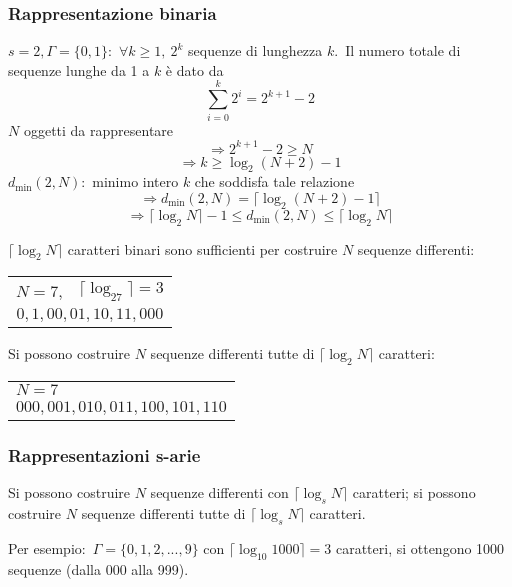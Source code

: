 \subsubsection{Rappresentazione binaria}

$s=2, \Gamma = \{0,1\}$:\ $\forall k \geq 1,\ 2^k$ sequenze di lunghezza $k$.\
Il numero totale di sequenze lunghe da 1 a $k$ è dato da \[\sum_{i=0}^k 2^i = 2^{k+1}-2\]
$N$ oggetti da rappresentare \[\Rightarrow 2^{k+1} -2 \geq N\]
\[\Rightarrow k \geq \log_2(N+2) -1 \]
$d_{\min}(2,N)$:\ minimo intero $k$ che soddisfa tale relazione
\[\Rightarrow d_{\min}(2,N) = \lceil\log_2(N+2)-1\rceil\]
\[\Rightarrow \lceil\log_2 N\rceil -1 \leq d_{\min}(2,N) \leq \lceil \log_2 N\rceil\]

\noindent $\lceil \log_2 N\rceil$ caratteri binari sono sufficienti per costruire $N$ sequenze differenti:

\begin{table}[H]
    \centering
    \begin{tabular}{l l}
        $N=7$, & $\lceil\log_27\rceil=3$          \\
        \multicolumn{2}{c}{$0,1,00,01,10,11,000$} \\
    \end{tabular}
\end{table}

\noindent Si possono costruire $N$ sequenze differenti tutte di $\lceil\log_2 N\rceil$ caratteri:

\begin{table}[H]
    \centering
    \begin{tabular}{l}
        $N=7$                           \\
        {$000,001,010,011,100,101,110$} \\
    \end{tabular}
\end{table}

\subsubsection{Rappresentazioni s-arie}

Si possono costruire $N$ sequenze differenti con $\lceil\log_sN\rceil$ caratteri; si possono costruire $N$ sequenze differenti tutte di $\lceil\log_sN\rceil$ caratteri.\

Per esempio:\ $\Gamma = \{0,1,2,...,9\}$ con $\lceil\log_{10} 1000\rceil = 3$ caratteri, si ottengono 1000 sequenze (dalla 000 alla 999).\

